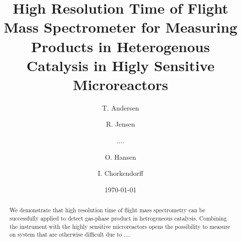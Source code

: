 \documentclass[aip,rsi]{revtex4-1}
\begin{document}

\title{High Resolution Time of Flight Mass Spectrometer for Measuring Products in Heterogenous Catalysis in Higly Sensitive Microreactors} %



\author{T. Andersen}
\author{R. Jensen}
\author{....}
\author{O. Hansen}
\author{I. Chorkendorff}


\date{\today}

\begin{abstract}
We demonstrate that high resolution time of flight mass spectrometry can be successfully applied to detect gas-phase product in hetrogeneous catalysis. Combining the instrument with the highly sensitive microreactors opens the possibility to measure on system that are otherwise difficult due to ....
\end{abstract}

\pacs{}%

\maketitle %
\end{document}
